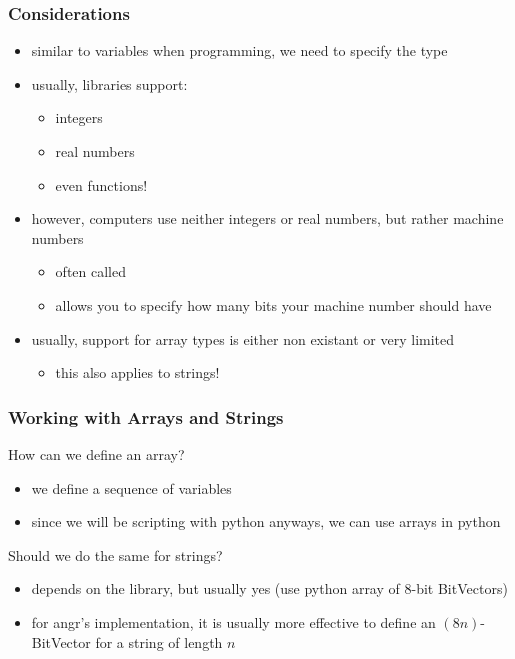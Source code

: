 \documentclass[aspectratio=169]{beamer}
\begin{document}
{\begin{frame}[fragile]
    \frametitle{Considerations}
    \begin{itemize}
        \item similar to variables when programming, we need to specify the type
        \item usually, libraries support:
        \begin{itemize}
            \item integers
            \item real numbers
            \item even functions!
        \end{itemize}
        \item however, computers use neither integers or real numbers, but rather machine numbers
        \begin{itemize}
            \item often called 
            \item allows you to specify how many bits your machine number should have
        \end{itemize}
        \item usually, support for array types is either non existant or very limited
        \begin{itemize}
            \item this also applies to strings!
        \end{itemize}
    \end{itemize}
\end{frame}

\begin{frame}
    \frametitle{Working with Arrays and Strings}
    How can we define an array?
    \pause
    \begin{itemize}
        \item we define a sequence of variables
        \item since we will be scripting with python anyways, we can use arrays in python
    \end{itemize}
    Should we do the same for strings?
    \pause
    \begin{itemize}
        \item depends on the library, but usually yes (use python array of 8-bit BitVectors)
        \item for angr's implementation, it is usually more effective to define an $(8n)$-BitVector for a string of length $n$
    \end{itemize}
\end{frame}

}
\end{document}
